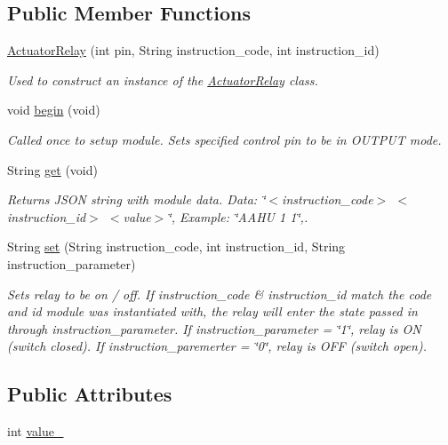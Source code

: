 \subsection*{Public Member Functions}
\begin{DoxyCompactItemize}
\item 
\hyperlink{class_actuator_relay_a0a19fabbd9a3ee500d906a55579ae4f3}{Actuator\+Relay} (int pin, String instruction\+\_\+code, int instruction\+\_\+id)
\begin{DoxyCompactList}\small\item\em Used to construct an instance of the \hyperlink{class_actuator_relay}{Actuator\+Relay} class. \end{DoxyCompactList}\item 
void \hyperlink{class_actuator_relay_abd921e88bb8fcecfbd5e1213e1faad56}{begin} (void)
\begin{DoxyCompactList}\small\item\em Called once to setup module. Sets specified control pin to be in O\+U\+T\+P\+U\+T mode. \end{DoxyCompactList}\item 
String \hyperlink{class_actuator_relay_affbcfa491c42a0aae3d69450cf7295b1}{get} (void)
\begin{DoxyCompactList}\small\item\em Returns J\+S\+O\+N string with module data. Data\+: \char`\"{}$<$instruction\+\_\+code$>$ $<$instruction\+\_\+id$>$ $<$value$>$\char`\"{}, Example\+: \char`\"{}\+A\+A\+H\+U 1 1\char`\"{},. \end{DoxyCompactList}\item 
String \hyperlink{class_actuator_relay_a29995263e5a05a3fdff0761cb4730306}{set} (String instruction\+\_\+code, int instruction\+\_\+id, String instruction\+\_\+parameter)
\begin{DoxyCompactList}\small\item\em Sets relay to be on / off. If instruction\+\_\+code \& instruction\+\_\+id match the code and id module was instantiated with, the relay will enter the state passed in through instruction\+\_\+parameter. If instruction\+\_\+parameter = \char`\"{}1\char`\"{}, relay is O\+N (switch closed). If instruction\+\_\+paremerter = \char`\"{}0\char`\"{}, relay is O\+F\+F (switch open). \end{DoxyCompactList}\end{DoxyCompactItemize}
\subsection*{Public Attributes}
\begin{DoxyCompactItemize}
\item 
int \hyperlink{class_actuator_relay_a8f63c9df6e8dfc90425838f6c1c8fb0e}{value\+\_\+}
\end{DoxyCompactItemize}


